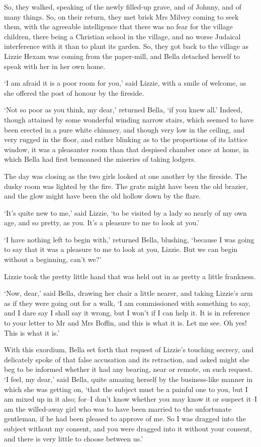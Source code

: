 So, they walked, speaking of the newly filled-up grave, and of Johnny,
and of many things. So, on their return, they met brisk Mrs Milvey
coming to seek them, with the agreeable intelligence that there was no
fear for the village children, there being a Christian school in the
village, and no worse Judaical interference with it than to plant its
garden. So, they got back to the village as Lizzie Hexam was coming from
the paper-mill, and Bella detached herself to speak with her in her own
home.

‘I am afraid it is a poor room for you,’ said Lizzie, with a smile of
welcome, as she offered the post of honour by the fireside.

‘Not so poor as you think, my dear,’ returned Bella, ‘if you knew all.’
Indeed, though attained by some wonderful winding narrow stairs, which
seemed to have been erected in a pure white chimney, and though very low
in the ceiling, and very rugged in the floor, and rather blinking as
to the proportions of its lattice window, it was a pleasanter room than
that despised chamber once at home, in which Bella had first bemoaned
the miseries of taking lodgers.

The day was closing as the two girls looked at one another by the
fireside. The dusky room was lighted by the fire. The grate might have
been the old brazier, and the glow might have been the old hollow down
by the flare.

‘It’s quite new to me,’ said Lizzie, ‘to be visited by a lady so nearly
of my own age, and so pretty, as you. It’s a pleasure to me to look at
you.’

‘I have nothing left to begin with,’ returned Bella, blushing, ‘because
I was going to say that it was a pleasure to me to look at you, Lizzie.
But we can begin without a beginning, can’t we?’

Lizzie took the pretty little hand that was held out in as pretty a
little frankness.

‘Now, dear,’ said Bella, drawing her chair a little nearer, and taking
Lizzie’s arm as if they were going out for a walk, ‘I am commissioned
with something to say, and I dare say I shall say it wrong, but I
won’t if I can help it. It is in reference to your letter to Mr and Mrs
Boffin, and this is what it is. Let me see. Oh yes! This is what it is.’

With this exordium, Bella set forth that request of Lizzie’s touching
secrecy, and delicately spoke of that false accusation and its
retraction, and asked might she beg to be informed whether it had any
bearing, near or remote, on such request. ‘I feel, my dear,’ said Bella,
quite amazing herself by the business-like manner in which she was
getting on, ‘that the subject must be a painful one to you, but I
am mixed up in it also; for--I don’t know whether you may know it or
suspect it--I am the willed-away girl who was to have been married to
the unfortunate gentleman, if he had been pleased to approve of me. So
I was dragged into the subject without my consent, and you were dragged
into it without your consent, and there is very little to choose between
us.’

